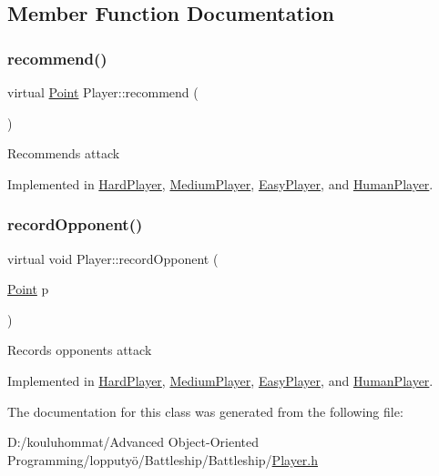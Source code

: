 \subsection{Member Function Documentation}
\mbox{\label{class_player_a2cc7a83d11158eafd8d49d4b9f23ce56}} 
\subsubsection{\texorpdfstring{recommend()}{recommend()}}
{\footnotesize\ttfamily virtual \mbox{\hyperlink{class_point}{Point}} Player\+::recommend (\begin{DoxyParamCaption}{ }\end{DoxyParamCaption})\hspace{0.3cm}{\ttfamily [pure virtual]}}

Recommends attack 

Implemented in \mbox{\hyperlink{class_hard_player_ae1d21325a648a88f1bf51f2b0b286190}{Hard\+Player}}, \mbox{\hyperlink{class_medium_player_a2e99d57f30f3f7f929840b8cda16527d}{Medium\+Player}}, \mbox{\hyperlink{class_easy_player_a9b00f4a9acc74ff688c609bc15bdbb4d}{Easy\+Player}}, and \mbox{\hyperlink{class_human_player_a718f16f3ddeeb34c9f2e93cf1d805b46}{Human\+Player}}.

\mbox{\label{class_player_a768e14edee61e208e6fd295cdd72a49c}} 
\subsubsection{\texorpdfstring{record\+Opponent()}{recordOpponent()}}
{\footnotesize\ttfamily virtual void Player\+::record\+Opponent (\begin{DoxyParamCaption}\item[{\mbox{\hyperlink{class_point}{Point}}}]{p }\end{DoxyParamCaption})\hspace{0.3cm}{\ttfamily [pure virtual]}}

Records opponent\textquotesingle{}s attack 

Implemented in \mbox{\hyperlink{class_hard_player_a986175fb966099ac5fe39950e18799ae}{Hard\+Player}}, \mbox{\hyperlink{class_medium_player_a6183d4a8fe3d68419afcfa9e33cd5928}{Medium\+Player}}, \mbox{\hyperlink{class_easy_player_a2121149ace67b4a67a5dfa7633738ea3}{Easy\+Player}}, and \mbox{\hyperlink{class_human_player_a16b18f42e02d7c8d1f0971ce5e91595f}{Human\+Player}}.



The documentation for this class was generated from the following file\+:\begin{DoxyCompactItemize}
\item 
D\+:/kouluhommat/\+Advanced Object-\/\+Oriented Programming/lopputyö/\+Battleship/\+Battleship/\mbox{\hyperlink{_player_8h}{Player.\+h}}\end{DoxyCompactItemize}
